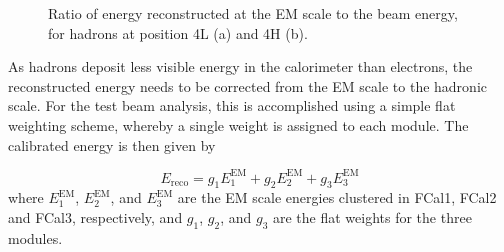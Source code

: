 %
%
%
%
%
%
%
%
%
%


\begin{figure}[!htb]
\begin{centering}
\caption[Reconstructed energy (EM scale) vs beam energy, hadrons]{Ratio of energy reconstructed at the EM scale to the beam energy, for hadrons at position 4L (a) and 4H (b).} 
\label{hadron_linearity_EMc16}
\end{centering}
\end{figure}



As hadrons deposit less visible energy in the calorimeter than electrons, the reconstructed energy needs to be corrected from the EM scale to the hadronic scale. For the test beam analysis, this is accomplished  using a simple flat weighting scheme, whereby a single weight is assigned to each module. The calibrated energy is then given by 

\begin{equation}
E_\mathrm{reco} = g_1 E_1^\mathrm{EM} +  g_2 E_2^\mathrm{EM} +  g_3 E_3^\mathrm{EM}
\end{equation}
 where $E_1^\mathrm{EM}$, $E_2^\mathrm{EM}$, and $E_3^\mathrm{EM}$ are the EM scale energies clustered in FCal1, FCal2 and FCal3, respectively,  and $g_1$, $g_2$, and $g_3$ are the flat weights for the three modules.
 
 
 
